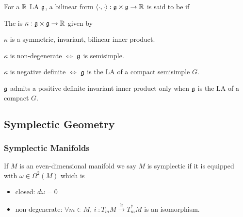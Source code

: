 \documentclass{article}
\begin{document}
\begin{definition}
	For a $\mathbb{R}$ LA $\mathfrak{g}$, a bilinear form $\left\langle \cdot,\cdot \right\rangle:\mathfrak{g} \times \mathfrak{g} \to \mathbb{R}$ is said to be  if 
\end{definition}

\begin{definition}
	The  is $\kappa:\mathfrak{g} \times \mathfrak{g} \to \mathbb{R}$ given by 
\end{definition}

\begin{lemma}
	$\kappa$ is a symmetric, invariant, bilinear inner product. 
\end{lemma}

\begin{fact}
	$\kappa$ is non-degenerate $\Leftrightarrow$ $\mathfrak{g}$ is semisimple. 
\end{fact}

\begin{fact}
	$\kappa$ is negative definite $\Leftrightarrow$ $\mathfrak{g}$ is the LA of a compact semisimple $G$.
\end{fact}

\begin{fact}
	$\mathfrak{g}$ admits a positive definite invariant inner product only when $\mathfrak{g}$ is the LA of a compact $G$. 
\end{fact}
\subsection{Symplectic Geometry}
\subsubsection{Symplectic Manifolds}

\begin{definition}
If $M$ is an even-dimensional manifold we say $M$ is symplectic if it is  equipped with $\omega \in \Omega^2(M)$ which is 
\begin{itemize}
    \item closed: $d\omega = 0$
    \item non-degenerate: $\forall m \in M,\, i_\cdot : T_m M \overset{\cong}{\to} T_m^\ast M$ is an isomorphism. 
\end{itemize}
\end{definition}
\end{document}
